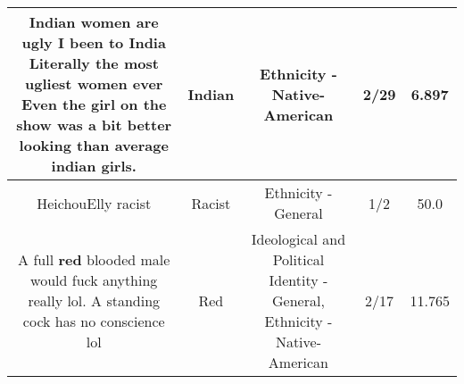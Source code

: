 \documentclass[11pt]{article}
\newlength\mylength
\begin{document}
\begin{center}
\begin{longtable}{|C{.65\mylength}|C{.30\mylength}|C{.12\mylength}|C{.12\mylength}|C{.12\mylength}|}
  \small Indian women are ugly I been to India Literally the most ugliest women ever Even the girl on the show was a bit better looking than average \textbf{indian} girls.\normalsize   & Indian & Ethnicity - Native-American & 2/29 & 6.897 \\  \hline
  \small HeichouElly racist\normalsize   & Racist & Ethnicity - General & 1/2 & 50.0 \\  \hline
  \small A full \textbf{r\textbf{ed}} blooded male would fuck anything really lol. A standing cock has no conscience lol\normalsize   & Red &  Ideological and Political Identity - General, Ethnicity - Native-American & 2/17 & 11.765 \\  \hline

\end{longtable}
\end{center}
\end{document}
